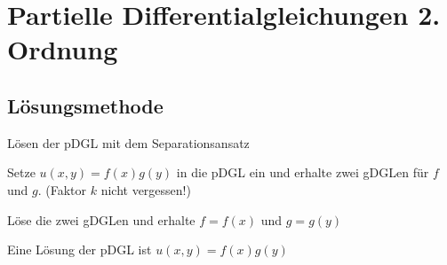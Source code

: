 \documentclass[german,color,5pt]{latex4ei/latex4ei_fs}
\begin{document}
\section{Partielle Differentialgleichungen 2. Ordnung}

\begin{sectionbox}
	\subsection{Lösungsmethode}
	\label{subsubsec:separationsansatz}
	\begin{cookbox}{Lösen der pDGL mit dem Separationsansatz}
		\item Setze $u(x,y)=f(x)g(y) $ in die pDGL ein und erhalte zwei gDGLen für $f$ und $g$. (Faktor $k$ nicht vergessen!)
		\item Löse die zwei gDGLen und erhalte $f=f(x)$ und $g=g(y) $
		\item Eine Lösung der pDGL ist $u(x,y)=f(x)g(y) $
	\end{cookbox}
\end{sectionbox}

\end{document}
